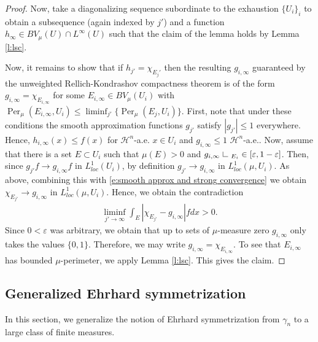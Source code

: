 \documentclass[12pt]{amsart}
\numberwithin{equation}{section}
\theoremstyle{plain}
\theoremstyle{definition}
\newcommand{\res}{\hbox{ {\vrule height .22cm}{\leaders\hrule\hskip.2cm} }}
\begin{document}
\begin{proof}
Now, take a diagonalizing sequence subordinate to the exhaustion $\{U_i\}_i$ to obtain a subsequence (again indexed by $j'$) and a function $h_{\infty} \in BV_{\mu}(U) \cap L^{\infty}(U)$ such that 
the claim of the lemma holds by Lemma \ref{l:lsc}.

Now, it remains to show that if $h_{j'}= \chi_{E_j'}$ then the resulting $g_{i, \infty}$ guaranteed by the unweighted Rellich-Kondrashov compactness theorem is of the form $g_{i, \infty} = \chi_{E_{i, \infty}}$ for some $E_{i, \infty} \in BV_{\mu}(U_i)$ with $\operatorname{Per}_{\mu}(E_{i,\infty}, U_i) \le \liminf_{j'} \{\operatorname{Per}_{\mu}(E_{j}, U_i)\}$.  First, note that under these conditions the smooth approximation functions $g_{j'}$ satisfy $|g_{j'}| \le 1$ everywhere.  Hence, $h_{i, \infty}(x) \le f(x)$ for $\mathcal{H}^n$-a.e. $x \in U_i$ and $g_{i, \infty} \le 1$ $\mathcal{H}^n$-a.e.. Now, assume that there is a set $E \subset U_i$ such that $\mu(E)> 0$ and $g_{i, \infty}\res_{E_i} \in [\varepsilon, 1-\varepsilon]$.  Then, since $g_{j'} f \rightarrow g_{i, \infty}f$ in $L^1_{loc}(U_i)$, by definition $g_{j'} \rightarrow g_{i, \infty}$ in $L^1_{loc}(\mu, U_i)$. As above, combining this with \eqref{e:smooth approx and strong convergence} we obtain $\chi_{E_{j'}} \rightarrow g_{i, \infty}$ in $L^1_{loc}(\mu, U_i)$. Hence, we obtain the contradiction 
\begin{align*}
\liminf_{j' \rightarrow \infty} \int_E |\chi_{E_{j'}} - g_{i, \infty}|f dx >0.
\end{align*}
Since $0<\varepsilon$ was arbitrary, we obtain that up to sets of $\mu$-measure zero $g_{i, \infty}$ only takes the values $\{0,1\}$. Therefore, we may write $g_{i, \infty} = \chi_{E_{i, \infty}}$. To see that $E_{i, \infty}$ has bounded $\mu$-perimeter, we apply Lemma \ref{l:lsc}.  This gives the claim.
\end{proof}

\subsection{Generalized Ehrhard symmetrization}\label{Generalized Ehrhard symmetrization}

In this section, we generalize the notion of Ehrhard symmetrization from $\gamma_n$ to a large class of finite measures.
\end{document}
